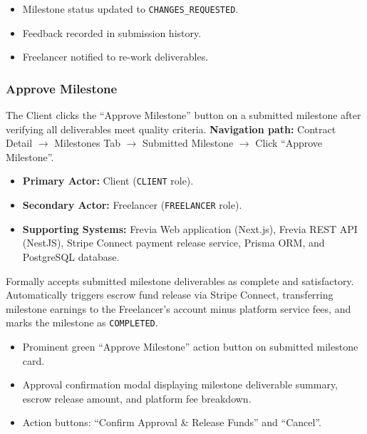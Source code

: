 \begin{itemize}[leftmargin=1.6em,topsep=3pt,itemsep=2pt,parsep=0pt,label=$\bullet$]
      \item Milestone status updated to \texttt{CHANGES\_REQUESTED}.
      \item Feedback recorded in submission history.
      \item Freelancer notified to re-work deliverables.
\end{itemize}

\subsubsection{ Approve Milestone}

The Client clicks the ``Approve Milestone'' button on a submitted milestone after verifying all deliverables meet quality criteria.\newline
\textbf{Navigation path:} Contract Detail $\rightarrow$ Milestones Tab $\rightarrow$ Submitted Milestone $\rightarrow$ Click ``Approve Milestone''.


\begin{itemize}[leftmargin=1.6em,topsep=3pt,itemsep=2pt,parsep=0pt,label=$\bullet$]
      \item \textbf{Primary Actor:} Client (\texttt{CLIENT} role).
      \item \textbf{Secondary Actor:} Freelancer (\texttt{FREELANCER} role).
      \item \textbf{Supporting Systems:} Frevia Web application (Next.js), Frevia REST API (NestJS), Stripe Connect payment release service, Prisma ORM, and PostgreSQL database.
\end{itemize}

\noindent Formally accepts submitted milestone deliverables as complete and satisfactory. Automatically triggers escrow fund release via Stripe Connect, transferring milestone earnings to the Freelancer's account minus platform service fees, and marks the milestone as \texttt{COMPLETED}.

\begin{itemize}[leftmargin=1.6em,topsep=3pt,itemsep=2pt,parsep=0pt,label=$\bullet$]
      \item Prominent green ``Approve Milestone'' action button on submitted milestone card.
      \item Approval confirmation modal displaying milestone deliverable summary, escrow release amount, and platform fee breakdown.
      \item Action buttons: ``Confirm Approval \& Release Funds'' and ``Cancel''.
\end{itemize}

